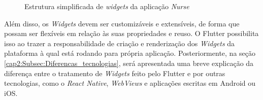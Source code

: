 \begin{figure}[ht!]
    	
  \centering
            \qquad
    \caption[Estrutura simplificada de \textit{widgets} da aplicação \textit{Nurse}]{Estrutura simplificada de \textit{widgets} da aplicação \textit{Nurse}}
  
  \label{fig:nurse-widget-tree}
\end{figure}
  
Além disso, os \textit{Widgets} devem ser customizáveis e extensíveis, de forma que possam ser flexíveis em relação às suas propriedades e reuso. O Flutter possibilita isso ao trazer a responsabilidade de criação e renderização dos \textit{Widgets} da plataforma à qual está rodando para própria aplicação. Posteriormente, na seção \ref{cap2:Subsec:Diferencas_tecnologias}, será apresentada uma breve explicação da diferença entre o tratamento de \textit{Widgets} feito pelo Flutter e por outras tecnologias, como o \textit{React Native}, \textit{WebViews} e aplicações escritas em Android ou iOS.


